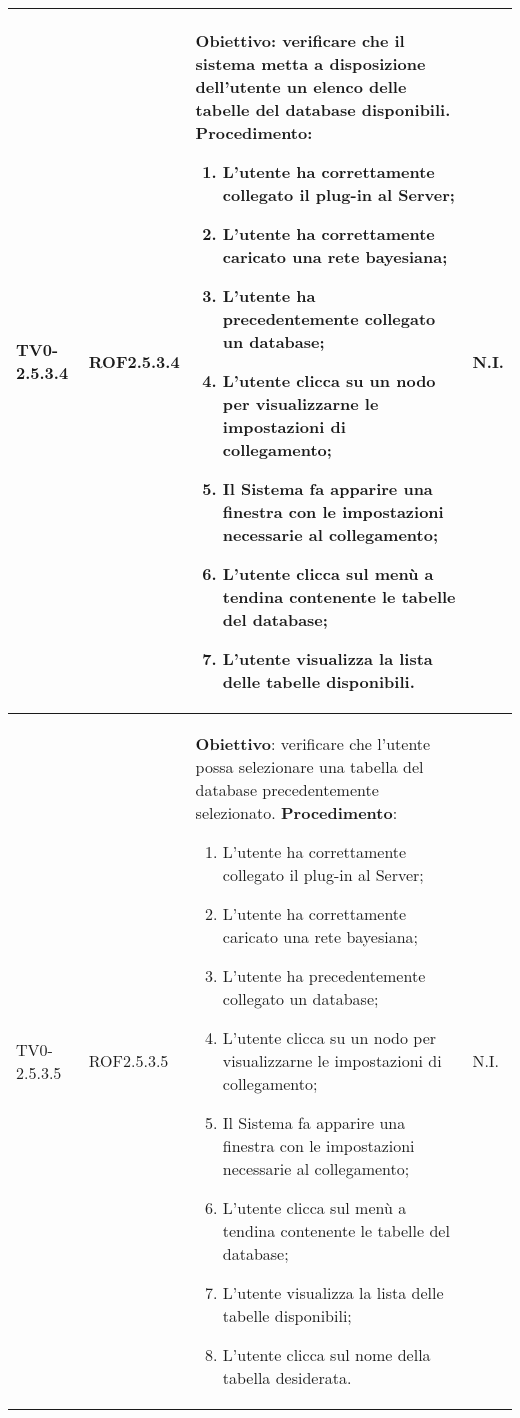 \begin{longtable}{|C{.15\textwidth}|C{.13\textwidth}|m{.52\textwidth}|C{.08\textwidth}|}
TV0-2.5.3.4 & ROF2.5.3.4 &
	\textbf{Obiettivo}: verificare che il sistema metta a disposizione dell'utente un elenco delle tabelle del database disponibili. \newline
	\textbf{Procedimento}:
	\begin{enumerate}
		\item L'utente ha correttamente collegato il plug-in al Server;
		\item L'utente ha correttamente caricato una rete bayesiana;
		\item L'utente ha precedentemente collegato un database;
		\item L'utente clicca su un nodo per visualizzarne le impostazioni di collegamento;
		\item Il Sistema fa apparire una finestra con le impostazioni necessarie al collegamento;
		\item L'utente clicca sul menù a tendina contenente le tabelle del database;
		\item L'utente visualizza la lista delle tabelle disponibili.
			\end{enumerate} & N.I. \\
\hline

TV0-2.5.3.5 & ROF2.5.3.5 &
	\textbf{Obiettivo}: verificare che l'utente possa selezionare una tabella del database precedentemente selezionato. \newline
	\textbf{Procedimento}:
	\begin{enumerate}
		\item L'utente ha correttamente collegato il plug-in al Server;
		\item L'utente ha correttamente caricato una rete bayesiana;
		\item L'utente ha precedentemente collegato un database;
		\item L'utente clicca su un nodo per visualizzarne le impostazioni di collegamento;
		\item Il Sistema fa apparire una finestra con le impostazioni necessarie al collegamento;
		\item L'utente clicca sul menù a tendina contenente le tabelle del database;
		\item L'utente visualizza la lista delle tabelle disponibili;
		\item L'utente clicca sul nome della tabella desiderata.
			\end{enumerate} & N.I. \\
\hline


\end{longtable}
